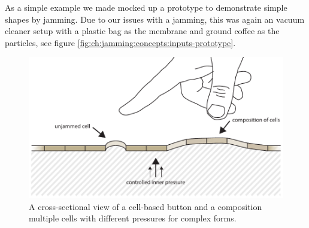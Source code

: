 As a simple example we made mocked up a prototype to demonstrate simple shapes by jamming.
Due to our issues with a jamming, this was again an vacuum cleaner setup with a plastic bag as the membrane and ground coffee as the particles, see figure \ref{fig:ch:jamming:concepts:inputs-prototype}.

\begin{figure}[h]
  \centering
  \includegraphics[width=.9\textwidth]{figures/jamming/concepts/jamming-inputs-concept.pdf}
  \caption{A cross-sectional view of a cell-based button and a composition multiple cells with different pressures for complex forms.}
  \label{fig:ch:jamming:concepts:button-cells}
\end{figure}


